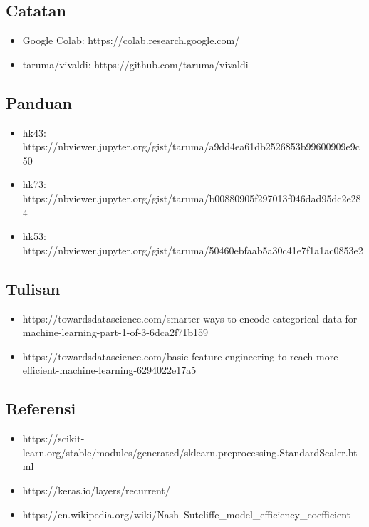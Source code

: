 \documentclass[11pt]{article}
\providecommand{\tightlist}{%
      \setlength{\itemsep}{0pt}\setlength{\parskip}{0pt}}
\begin{document}
\hypertarget{catatan}{%
\subsection{Catatan}\label{catatan}}

\begin{itemize}
\tightlist
\item
  Google Colab: https://colab.research.google.com/
\item
  taruma/vivaldi: https://github.com/taruma/vivaldi
\end{itemize}

\hypertarget{panduan}{%
\subsection{Panduan}\label{panduan}}

\begin{itemize}
\tightlist
\item
  hk43:
  https://nbviewer.jupyter.org/gist/taruma/a9dd4ea61db2526853b99600909e9c50
\item
  hk73:
  https://nbviewer.jupyter.org/gist/taruma/b00880905f297013f046dad95dc2e284
\item
  hk53:
  https://nbviewer.jupyter.org/gist/taruma/50460ebfaab5a30c41e7f1a1ac0853e2
\end{itemize}

\hypertarget{tulisan}{%
\subsection{Tulisan}\label{tulisan}}

\begin{itemize}
\tightlist
\item
  https://towardsdatascience.com/smarter-ways-to-encode-categorical-data-for-machine-learning-part-1-of-3-6dca2f71b159
\item
  https://towardsdatascience.com/basic-feature-engineering-to-reach-more-efficient-machine-learning-6294022e17a5
\end{itemize}

\hypertarget{referensi}{%
\subsection{Referensi}\label{referensi}}

\begin{itemize}
\tightlist
\item
  https://scikit-learn.org/stable/modules/generated/sklearn.preprocessing.StandardScaler.html
\item
  https://keras.io/layers/recurrent/
\item
  https://en.wikipedia.org/wiki/Nash--Sutcliffe\_model\_efficiency\_coefficient
\end{itemize}
\end{document}
